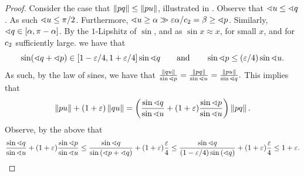 \documentclass[12pt]{article}%
\begin{document}
\begin{proof}
    
    Consider the case that $\left\| p q \right\|\leq \left\| p u \right\|$,
    illustrated in .  Observe that
    $\sphericalangle u \leq \sphericalangle q$.  As such
    $\sphericalangle u \leq \pi/2$.  Furthermore,
    $\sphericalangle u \geq \alpha \gg \varepsilon \alpha/c_2 = \beta \geq
    \sphericalangle p$. Similarly,
    $\sphericalangle q \in [\alpha, \pi -\alpha]$.  By the $1$-Lipshitz of
    $\sin$, and as $\sin x \approx x$, for small $x$, and for
    $c_2$ sufficiently large. we have that
    \begin{equation*}
        \sin( \angleX{\pb} + \angleX{\pa}) \in [1-\eps/4, 1+\eps/4] \sin
        \angleX{\pb}%
        \qquad\text{and}\qquad
        \sin \angleX{\pa} \leq (\eps/4) \sin \angleX{\pc}.
    \end{equation*}
    As such, by the
    law of sines, we have that
    \begin{math}
        \frac{\dY{\pb}{ \pc}}{\sin{\angleX{\pa}}}%
        =%
        \frac{\dY{\pa}{ \pb}}{\sin{\angleX{\pc}}}%
        =%
        \frac{\dY{\pa}{ \pc}}{\sin{\angleX{\pb}}}.%
    \end{math}
    This implies that
    \begin{equation*}
        \dY{\pa}{\pc}%
        +%
        (1+\eps)\dY{\pb}{\pc}%
        =%
        \pth{\frac{\sin{\angleX{\pb}}}{\sin{\angleX{\pc}}} +(1+\eps)
           \frac{\sin{\angleX{\pa}}}{\sin{\angleX{\pc}}} }\dY{\pa}{ \pb}.        
    \end{equation*}
    Observe, by the above that
    \begin{equation*}
        \frac{\sin{\angleX{\pb}}}{\sin{\angleX{\pc}}}
        +(1+\eps)
        \frac{\sin{\angleX{\pa}}}{\sin{\angleX{\pc}}}        
        \leq
        \frac{\sin{\angleX{\pb}}}{\sin{\pth{\angleX{\pa} + \angleX{\pb}}}}
        +(1+\eps)
        \frac{\eps}{4}
        \leq%
        \frac{\sin{\angleX{\pb}}}{(1-\eps/4)\sin{\pth{\angleX{\pb}}}}
        +(1+\eps)
        \frac{\eps}{4}
        \leq%
        1+\eps.
    \end{equation*}


\end{proof}
\end{document}
